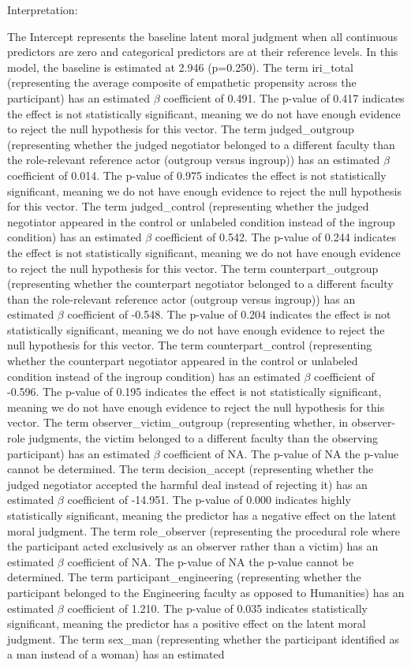 \documentclass[11pt]{article}
\begin{document}
Interpretation:

The Intercept represents the baseline latent moral judgment when all continuous predictors are zero and categorical predictors are at their reference levels. In this model, the baseline is estimated at 2.946 (p=0.250). The term iri\_total (representing the average composite of empathetic propensity across the participant) has an estimated $\beta$ coefficient of 0.491. The p-value of 0.417 indicates the effect is not statistically significant, meaning we do not have enough evidence to reject the null hypothesis for this vector. The term judged\_outgroup (representing whether the judged negotiator belonged to a different faculty than the role-relevant reference actor (outgroup versus ingroup)) has an estimated $\beta$ coefficient of 0.014. The p-value of 0.975 indicates the effect is not statistically significant, meaning we do not have enough evidence to reject the null hypothesis for this vector. The term judged\_control (representing whether the judged negotiator appeared in the control or unlabeled condition instead of the ingroup condition) has an estimated $\beta$ coefficient of 0.542. The p-value of 0.244 indicates the effect is not statistically significant, meaning we do not have enough evidence to reject the null hypothesis for this vector. The term counterpart\_outgroup (representing whether the counterpart negotiator belonged to a different faculty than the role-relevant reference actor (outgroup versus ingroup)) has an estimated $\beta$ coefficient of -0.548. The p-value of 0.204 indicates the effect is not statistically significant, meaning we do not have enough evidence to reject the null hypothesis for this vector. The term counterpart\_control (representing whether the counterpart negotiator appeared in the control or unlabeled condition instead of the ingroup condition) has an estimated $\beta$ coefficient of -0.596. The p-value of 0.195 indicates the effect is not statistically significant, meaning we do not have enough evidence to reject the null hypothesis for this vector. The term observer\_victim\_outgroup (representing whether, in observer-role judgments, the victim belonged to a different faculty than the observing participant) has an estimated $\beta$ coefficient of NA. The p-value of NA the p-value cannot be determined. The term decision\_accept (representing whether the judged negotiator accepted the harmful deal instead of rejecting it) has an estimated $\beta$ coefficient of -14.951. The p-value of 0.000 indicates highly statistically significant, meaning the predictor has a negative effect on the latent moral judgment. The term role\_observer (representing the procedural role where the participant acted exclusively as an observer rather than a victim) has an estimated $\beta$ coefficient of NA. The p-value of NA the p-value cannot be determined. The term participant\_engineering (representing whether the participant belonged to the Engineering faculty as opposed to Humanities) has an estimated $\beta$ coefficient of 1.210. The p-value of 0.035 indicates statistically significant, meaning the predictor has a positive effect on the latent moral judgment. The term sex\_man (representing whether the participant identified as a man instead of a woman) has an estimated 
\end{document}
